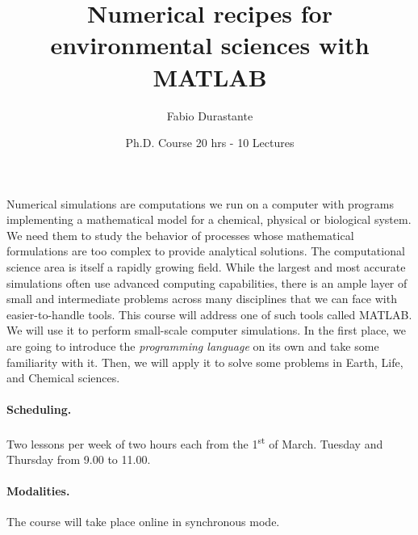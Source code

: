 \documentclass[a4paper]{article}
\title{Numerical recipes for environmental sciences with MATLAB}
\author[1]{Fabio Durastante}
\affil[1]{Università di Pisa, Dipartimento di Matematica}
\date{Ph.D. Course 20 hrs - 10 Lectures}
\begin{document}
	
\maketitle	
	
Numerical simulations are computations we run on a computer with programs implementing a mathematical model for a chemical, physical or biological system. We need them to study the behavior of processes whose mathematical formulations are too complex to provide analytical solutions. The computational science area is itself a rapidly growing field. While the largest and most accurate simulations often use advanced computing capabilities, there is an ample layer of small and intermediate problems across many disciplines that we can face with easier-to-handle tools. This course will address one of such tools called MATLAB. We will use it to perform small-scale computer simulations. In the first place, we are going to introduce the \emph{programming language} on its own and take some familiarity with it. Then, we will apply it to solve some problems in Earth, Life, and Chemical sciences. 

\paragraph{Scheduling.} Two lessons per week of two hours each from the 1\textsuperscript{st} of March. Tuesday and Thursday from 9.00 to 11.00.

\paragraph{Modalities.} The course will take place online in synchronous mode.

\nocite{*}
\printbibliography
\end{document}
